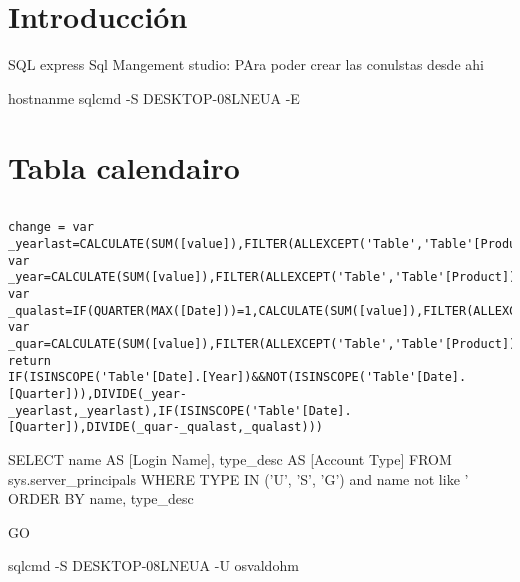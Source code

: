


\section{Introducción}

SQL express
Sql Mangement studio: PAra poder crear las conulstas desde ahi



hostnanme
sqlcmd -S DESKTOP-08LNEUA -E
\section{Tabla calendairo}


\begin{lstlisting}[numbers=none]
% of Sales = DIVIDE([Asset AUM],CALCULATE([Asset AUM],ALL('Dimension')))
\end{lstlisting}
 


\begin{lstlisting}[numbers=none]
change = var _yearlast=CALCULATE(SUM([value]),FILTER(ALLEXCEPT('Table','Table'[Product]),YEAR([Date])=YEAR(MAX([Date]))-1))
var _year=CALCULATE(SUM([value]),FILTER(ALLEXCEPT('Table','Table'[Product]),YEAR([Date])=YEAR(MAX([Date]))))
var _qualast=IF(QUARTER(MAX([Date]))=1,CALCULATE(SUM([value]),FILTER(ALLEXCEPT('Table','Table'[Product]),YEAR([Date])=YEAR(MAX([Date]))-1&&QUARTER([Date])=4)),CALCULATE(SUM([value]),FILTER(ALLEXCEPT('Table','Table'[Product]),YEAR([Date])=YEAR(MAX([Date]))&&QUARTER([Date])=QUARTER(MAX([Date]))-1)))
var _quar=CALCULATE(SUM([value]),FILTER(ALLEXCEPT('Table','Table'[Product]),YEAR([Date])=YEAR(MAX([Date]))&&QUARTER([Date])=QUARTER(MAX([Date]))))
return 
IF(ISINSCOPE('Table'[Date].[Year])&&NOT(ISINSCOPE('Table'[Date].[Quarter])),DIVIDE(_year-_yearlast,_yearlast),IF(ISINSCOPE('Table'[Date].[Quarter]),DIVIDE(_quar-_qualast,_qualast)))
\end{lstlisting}



SELECT name AS [Login Name], type_desc AS [Account Type]
FROM sys.server_principals 
WHERE TYPE IN ('U', 'S', 'G')
and name not like '%
ORDER BY name, type_desc

GO

sqlcmd -S DESKTOP-08LNEUA -U osvaldohm





